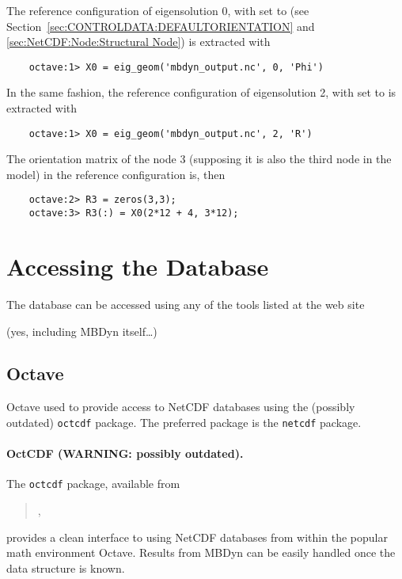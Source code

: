 The reference configuration of eigensolution 0, with 
set to  
(see Section~\ref{sec:CONTROLDATA:DEFAULTORIENTATION} 
and
\ref{sec:NetCDF:Node:Structural Node}) is extracted with
\begin{verbatim}
    octave:1> X0 = eig_geom('mbdyn_output.nc', 0, 'Phi')
\end{verbatim}
In the same fashion, the reference configuration of eigensolution 2, with
 set to  is extracted with
\begin{verbatim}
    octave:1> X0 = eig_geom('mbdyn_output.nc', 2, 'R')
\end{verbatim}
The orientation matrix of the node 3 (supposing it is also the third node in
the model) in the reference configuration is, then
\begin{verbatim}
    octave:2> R3 = zeros(3,3);
    octave:3> R3(:) = X0(2*12 + 4, 3*12);
\end{verbatim}
\section{Accessing the Database}
The database can be accessed using any of the tools listed at the web site
\begin{quote}
\end{quote}
(yes, including MBDyn itself\ldots)



\subsection{Octave}
\label{sec:NetCDF:Octave}
Octave used to provide access to NetCDF databases using the (possibly outdated) \texttt{octcdf} package.
The preferred package is the \texttt{netcdf} package.

\paragraph{OctCDF (WARNING: possibly outdated).}
The \texttt{octcdf} package, available from
\begin{quote}
,
\end{quote}
provides a clean interface to using NetCDF databases from within
the popular math environment Octave.
Results from MBDyn can be easily handled once the data structure is known.

